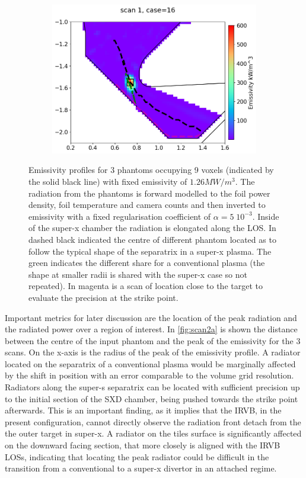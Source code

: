 \begin{figure}
\begin{subfigure}{0.33\linewidth}
         \centering
         \includegraphics[trim={0 0 0 35},clip,width=\textwidth]{Chapters/chapter2/figs/phantom_example3.png}
         \caption{}
         \label{fig:scan1c}
     \end{subfigure}
    \caption{Emissivity profiles for 3 phantoms occupying 9 voxels (indicated by the solid black line) with fixed emissivity of $1.26MW/m^3$. The radiation from the phantoms is forward modelled to the foil power density, foil temperature and camera counts and then inverted to emissivity with a fixed regularisation coefficient of $\alpha=5 \; 10^{-3}$. Inside of the super-x chamber the radiation is elongated along the LOS. In dashed black indicated the centre of different phantom located as to follow the typical shape of the separatrix in a super-x plasma. The green indicates the different share for a conventional plasma (the shape at smaller radii is shared with the super-x case so not repeated). In magenta is a scan of location close to the target to evaluate the precision at the strike point.}
    \label{fig:scan1}
\end{figure}

Important metrics for later discussion are the location of the peak radiation and the radiated power over a region of interest. In \autoref{fig:scan2a} is shown the distance between the centre of the input phantom and the peak of the emissivity for the 3 scans. On the x-axis is the radius of the peak of the emissivity profile. A radiator located on the separatrix of a conventional plasma would be marginally affected by the shift in position with an error comparable to the volume grid resolution. Radiators along the super-s separatrix can be located with sufficient precision up to the initial section of the SXD chamber, being pushed towards the strike point afterwards. This is an important finding, as it implies that the IRVB, in the present configuration, cannot directly observe the radiation front detach from the the outer target in super-x. A radiator on the tiles surface is significantly affected on the downward facing section, that more closely is aligned with the IRVB LOSs, indicating that locating the peak radiator could be difficult in the transition from a conventional to a super-x divertor in an attached regime.

